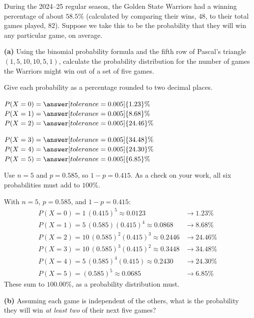 \documentclass[12pt]{ximera}
\begin{document}
\begin{problem}
During the 2024--25 regular season, the Golden State Warriors had a winning
percentage of about $58.5\%$ (calculated by comparing their wins, $48$, to their
total games played, $82$). Suppose we take this to be the probability that they will
win any particular game, on average.

\begin{prompt}
\textbf{(a)} Using the binomial probability formula and the fifth row of Pascal's
triangle $(1,5,10,10,5,1)$, calculate the probability distribution for the number of
games the Warriors might win out of a set of five games.

Give each probability as a percentage rounded to two decimal places.

$P(X=0)=\answer[tolerance=0.005]{1.23}\%$ \qquad
$P(X=1)=\answer[tolerance=0.005]{8.68}\%$ \qquad
$P(X=2)=\answer[tolerance=0.005]{24.46}\%$

\smallskip
$P(X=3)=\answer[tolerance=0.005]{34.48}\%$ \qquad
$P(X=4)=\answer[tolerance=0.005]{24.30}\%$ \qquad
$P(X=5)=\answer[tolerance=0.005]{6.85}\%$

\begin{hint}
Use $n=5$ and $p=0.585$, so $1-p=0.415$. As a check on your work, all six
probabilities must add to $100\%$.
\end{hint}

\begin{feedback}
With $n=5$, $p=0.585$, and $1-p=0.415$:
\[
\begin{array}{ll}
P(X=0)=1\,(0.415)^5 \approx 0.0123 & \to 1.23\%\\
P(X=1)=5\,(0.585)(0.415)^4 \approx 0.0868 & \to 8.68\%\\
P(X=2)=10\,(0.585)^2(0.415)^3 \approx 0.2446 & \to 24.46\%\\
P(X=3)=10\,(0.585)^3(0.415)^2 \approx 0.3448 & \to 34.48\%\\
P(X=4)=5\,(0.585)^4(0.415) \approx 0.2430 & \to 24.30\%\\
P(X=5)=(0.585)^5 \approx 0.0685 & \to 6.85\%
\end{array}
\]
These sum to $100.00\%$, as a probability distribution must.
\end{feedback}
\end{prompt}

\begin{prompt}
\textbf{(b)} Assuming each game is independent of the others, what is the probability
they will win \emph{at least two} of their next five games?


\end{prompt}
\end{problem}
\end{document}
